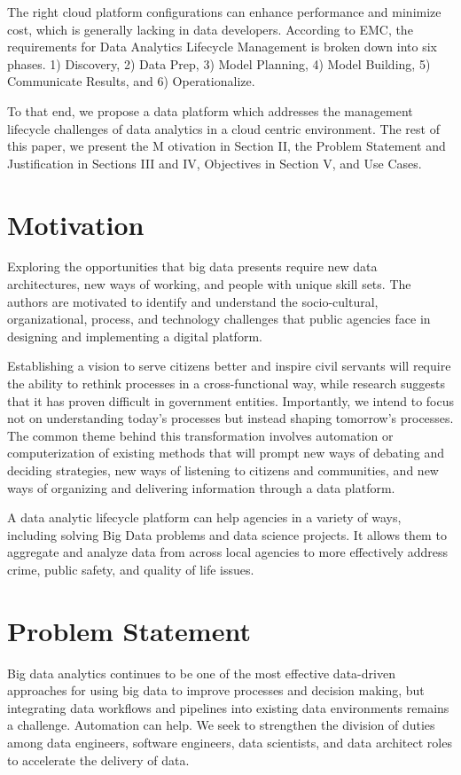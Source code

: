 \documentclass[conference]{IEEEtran}
\begin{document}
The right cloud platform configurations can enhance performance and minimize cost, which is generally lacking in data developers. According to EMC\cite{EMC}, the requirements for Data Analytics Lifecycle Management is broken down into six phases. 1) Discovery, 2) Data Prep, 3) Model Planning, 4) Model Building, 5) Communicate Results, and 6) Operationalize.

To that end, we propose a data platform which addresses the management lifecycle challenges of data analytics in a cloud centric environment.  The rest of this paper, we present the M otivation in Section II, the Problem Statement and Justification in Sections III and IV, Objectives in Section V, and Use Cases.
%
%
%
\section{Motivation}
Exploring the opportunities that big data presents require new data architectures,  new ways of working, and people with unique skill sets. The authors are motivated to identify and understand the socio-cultural, organizational, process, and technology challenges that public agencies face in designing and implementing a digital platform.  

Establishing a vision to serve citizens better and inspire civil servants will require the ability to rethink processes in a cross-functional way, while research suggests that it has proven difficult in government entities\cite{Weerakkody}.  Importantly, we intend to focus not on understanding today's processes but instead shaping tomorrow's processes. The common theme behind this transformation involves automation or computerization of existing methods that will prompt new ways of debating and deciding strategies, new ways of listening to citizens and communities, and new ways of organizing and delivering information\cite{eGov} through a data platform.  

A data analytic lifecycle platform can help agencies in a variety of ways, including solving Big Data problems and data science projects. It allows them to aggregate and analyze data from across local agencies to more effectively address crime, public safety, and quality of life issues. 
%
%
\section{Problem Statement}
Big data analytics continues to be one of the most effective data-driven approaches for using big data to improve processes and decision making, but integrating data workflows and pipelines into existing data environments remains a challenge. Automation can help.  We seek to strengthen the division of duties among data engineers, software engineers, data scientists, and data architect roles to accelerate the delivery of data.
\end{document}
